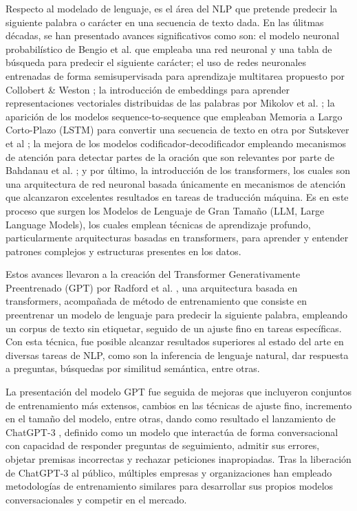 Respecto al modelado de lenguaje, es el área del NLP que pretende predecir la siguiente palabra o carácter en una
secuencia de texto dada. En las úlitmas décadas, se han presentado avances significativos
como son: el modelo neuronal probabilístico de Bengio et al. \cite{bengio_neural_2003}
que empleaba una red neuronal y una tabla de búsqueda para predecir el siguiente carácter;
el uso de redes neuronales entrenadas de forma semisupervisada para aprendizaje
multitarea propuesto por Collobert \& Weston \cite{collobert_unified_2008}; la
introducción de embeddings para aprender representaciones vectoriales distribuidas
de las palabras por Mikolov et al. \cite{mikolov_distributed_2013};
la aparición de los modelos sequence-to-sequence que empleaban Memoria a
Largo Corto-Plazo (LSTM) para convertir una secuencia de texto en otra por
Sutskever et al \cite{sutskever_sequence_2014}; la mejora de los modelos
codificador-decodificador empleando mecanismos de atención para detectar partes de la
oración que son relevantes por parte de Bahdanau et al. \cite{bahdanau_neural_2016};
y por último, la introducción de los transformers, los cuales
son una arquitectura de red neuronal basada únicamente en mecanismos de atención
\cite{vaswani_attention_2017} que alcanzaron excelentes resultados en tareas de traducción
máquina. Es en este proceso que surgen los Modelos de Lenguaje de Gran Tamaño
(LLM, Large Language Models), los cuales emplean técnicas de aprendizaje profundo,
particularmente arquitecturas basadas en transformers, para aprender y entender
patrones complejos y estructuras presentes en los datos.

Estos avances llevaron a la creación del Transformer Generativamente Preentrenado
(GPT) por Radford et al. \cite{radford_improving_2018}, una arquitectura basada en
transformers, acompañada de método de entrenamiento que consiste en preentrenar un modelo de
lenguaje para predecir la siguiente palabra, empleando un corpus de texto sin
etiquetar, seguido de un ajuste fino en tareas específicas. Con esta técnica,
fue posible alcanzar resultados superiores al estado del arte en
diversas tareas de NLP, como son la inferencia de lenguaje natural,
dar respuesta a preguntas, búsquedas por similitud semántica, entre otras.

La presentación del modelo GPT fue seguida de mejoras que incluyeron conjuntos de
entrenamiento más extensos, cambios en las técnicas de ajuste fino, incremento en
el tamaño del modelo, entre otras, dando como resultado el lanzamiento de
ChatGPT-3 \cite{openai_introducing_2022}, definido como un modelo que interactúa de forma
conversacional con capacidad de responder preguntas de seguimiento, admitir sus
errores, objetar premisas incorrectas y rechazar peticiones inapropiadas. Tras
la liberación de ChatGPT-3 al público, múltiples empresas y organizaciones han
empleado metodologías de entrenamiento similares para desarrollar sus propios
modelos conversacionales y competir en el mercado.

